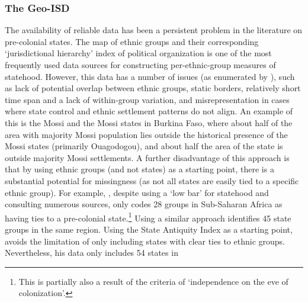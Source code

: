 \documentclass[12pt]{article}
\begin{document}

\subsubsection{The Geo-ISD} \label{The Geo-ISD}

The availability of reliable data has been a persistent problem in the
literature on pre-colonial states. The \citet{Murdock1967} map of ethnic groups
and their corresponding `jurisdictional hierarchy' index of political
organization is one of the most frequently used data sources for constructing
per-ethnic-group measures of statehood. However, this data has a number of
issues (as enumerated by \citet{Michalopoulos2018}), such as lack of potential
overlap between ethnic groups, static borders, relatively short time span and a
lack of within-group variation, and misrepresentation in cases where state
control and ethnic settlement patterns do not align. An example of this is the
Mossi and the Mossi states in Burkina Faso, where about half of the area with
majority Mossi population lies outside the historical presence of the Mossi
states (primarily Ouagodogou), and about half the area of the state is outside
majority Mossi settlements. A further disadvantage of this approach is that by
using ethnic groups (and not states) as a starting point, there is a substantial
potential for missingness (as not all states are easily tied to a specific
ethnic group). For example, \citet{Paine2019}, despite using a `low bar' for
statehood and consulting numerous sources, only codes 28 groups in Sub-Saharan
Africa as having ties to a pre-colonial state.\footnote{This is partially also a
result of the criteria of `independence on the eve of colonization'.} Using a
similar approach \citet{Wig2016} identifies 45 state groups in the same region.
Using the State Antiquity Index \citep{Bockstette2012} as a starting point,
\citet{Depetris-Chauvin2016} avoids the limitation of only including states with
clear ties to ethnic groups. Nevertheless, his data only includes 54 states in
\end{document}
